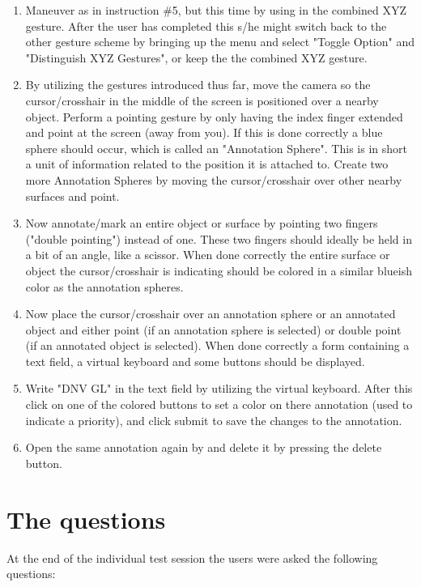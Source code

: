 \begin{enumerate}
    \item Maneuver as in instruction \#5, but this time by using in the combined XYZ gesture. After the user has completed this s/he might switch back to the other gesture scheme
          by bringing up the menu and select "Toggle Option" and "Distinguish XYZ Gestures", or keep the the combined XYZ gesture.

    \item By utilizing the gestures introduced thus far, move the camera so the cursor/crosshair in the middle of the screen is positioned over a nearby object. 
          Perform a pointing gesture by only having the index finger extended and point at the screen (away from you). If this is done correctly a blue sphere should occur, which
          is called an "Annotation Sphere". This is in short a unit of information related to the position it is attached to. Create two more Annotation Spheres by moving the 
          cursor/crosshair over other nearby surfaces and point. 
    
    \item Now annotate/mark an entire object or surface by pointing two fingers ("double pointing") instead of one. These two fingers should ideally be held in a bit of an angle, like a scissor. 
          When done correctly the entire surface or object the cursor/crosshair is indicating should be colored in a similar blueish color as the annotation spheres. 

    \item Now place the cursor/crosshair over an annotation sphere or an annotated object and either point (if an annotation sphere is selected) or double point (if an annotated
          object is selected). When done correctly a form containing a text field, a virtual keyboard and some buttons should be displayed. 

    \item Write "DNV GL" in the text field by utilizing the virtual keyboard. After this click on one of the colored buttons to set a color on there annotation (used to indicate a 
          priority), and click submit to save the changes to the annotation. 

    \item Open the same annotation again by and delete it by pressing the delete button.     
\end{enumerate}

\section{The questions}
At the end of the individual test session the users were asked the following questions: